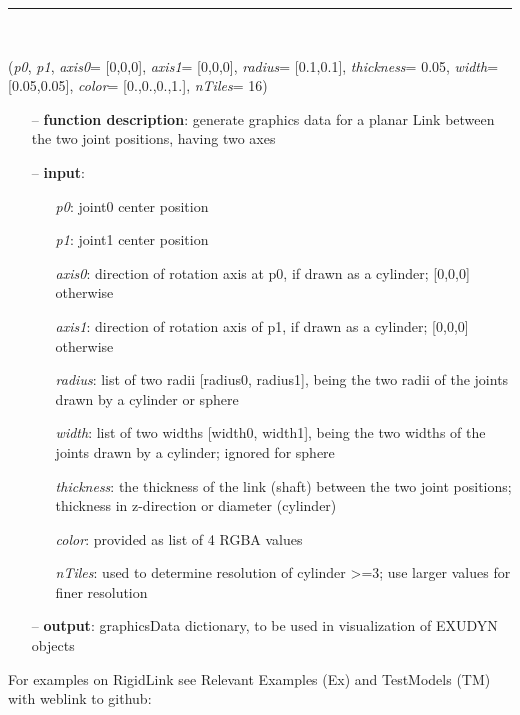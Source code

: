 \begin{itemize}[leftmargin=1.4cm]
\begin{itemize}[leftmargin=1.4cm]
\begin{itemize}[leftmargin=1.4cm]
\begin{itemize}[leftmargin=0.5cm]
\begin{itemize}[leftmargin=1.4cm]
\begin{itemize}[leftmargin=1.4cm]
\begin{itemize}[leftmargin=0.5cm]
\begin{itemize}[leftmargin=1.4cm]
%
\noindent\rule{8cm}{0.75pt}\vspace{1pt} \\ 
\begin{flushleft}
\label{sec:graphics:RigidLink}
({\it p0}, {\it p1}, {\it axis0}= [0,0,0], {\it axis1}= [0,0,0], {\it radius}= [0.1,0.1], {\it thickness}= 0.05, {\it width}= [0.05,0.05], {\it color}= [0.,0.,0.,1.], {\it nTiles}= 16)
\end{flushleft}
\setlength{\itemindent}{0.7cm}
\begin{itemize}[leftmargin=0.7cm]
\item[--]
{\bf function description}: generate graphics data for a planar Link between the two joint positions, having two axes
\item[--]
{\bf input}: \vspace{-6pt}
\begin{itemize}[leftmargin=1.2cm]
\setlength{\itemindent}{-0.7cm}
\item[]{\it p0}: joint0 center position
\item[]{\it p1}: joint1 center position
\item[]{\it axis0}: direction of rotation axis at p0, if drawn as a cylinder; [0,0,0] otherwise
\item[]{\it axis1}: direction of rotation axis of p1, if drawn as a cylinder; [0,0,0] otherwise
\item[]{\it radius}: list of two radii [radius0, radius1], being the two radii of the joints drawn by a cylinder or sphere
\item[]{\it width}: list of two widths [width0, width1], being the two widths of the joints drawn by a cylinder; ignored for sphere
\item[]{\it thickness}: the thickness of the link (shaft) between the two joint positions; thickness in z-direction or diameter (cylinder)
\item[]{\it color}: provided as list of 4 RGBA values
\item[]{\it nTiles}: used to determine resolution of cylinder >=3; use larger values for finer resolution
\end{itemize}
\item[--]
{\bf output}: graphicsData dictionary, to be used in visualization of EXUDYN objects
\vspace{12pt}\end{itemize}
%
%
\noindent For examples on RigidLink see Relevant Examples (Ex) and TestModels (TM) with weblink to github:

\end{itemize}
\end{itemize}
\end{itemize}
\end{itemize}
\end{itemize}
\end{itemize}
\end{itemize}
\end{itemize}
